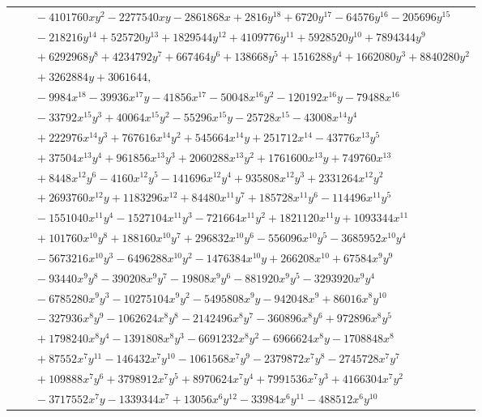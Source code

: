\documentclass[11pt]{article}
\begin{document}
\begin{longtable}{@{}ll@{}}
 & $\quad -4101760xy^{2}-2277540xy-2861868x+2816y^{18}+6720y^{17}-64576y^{16}-205696y^{15}$\\
 & $\quad -218216y^{14}+525720y^{13}+1829544y^{12}+4109776y^{11}+5928520y^{10}+7894344y^{9}$\\
 & $\quad +6292968y^{8}+4234792y^{7}+667464y^{6}+138668y^{5}+1516288y^{4}+1662080y^{3}+8840280y^{2}$\\
 & $\quad +3262884y+3061644,$\\
 & $\quad -9984x^{18}-39936x^{17}y-41856x^{17}-50048x^{16}y^{2}-120192x^{16}y-79488x^{16}$\\
 & $\quad -33792x^{15}y^{3}+40064x^{15}y^{2}-55296x^{15}y-25728x^{15}-43008x^{14}y^{4}$\\
 & $\quad +222976x^{14}y^{3}+767616x^{14}y^{2}+545664x^{14}y+251712x^{14}-43776x^{13}y^{5}$\\
 & $\quad +37504x^{13}y^{4}+961856x^{13}y^{3}+2060288x^{13}y^{2}+1761600x^{13}y+749760x^{13}$\\
 & $\quad +8448x^{12}y^{6}-4160x^{12}y^{5}-141696x^{12}y^{4}+935808x^{12}y^{3}+2331264x^{12}y^{2}$\\
 & $\quad +2693760x^{12}y+1183296x^{12}+84480x^{11}y^{7}+185728x^{11}y^{6}-114496x^{11}y^{5}$\\
 & $\quad -1551040x^{11}y^{4}-1527104x^{11}y^{3}-721664x^{11}y^{2}+1821120x^{11}y+1093344x^{11}$\\
 & $\quad +101760x^{10}y^{8}+188160x^{10}y^{7}+296832x^{10}y^{6}-556096x^{10}y^{5}-3685952x^{10}y^{4}$\\
 & $\quad -5673216x^{10}y^{3}-6496288x^{10}y^{2}-1476384x^{10}y+266208x^{10}+67584x^{9}y^{9}$\\
 & $\quad -93440x^{9}y^{8}-390208x^{9}y^{7}-19808x^{9}y^{6}-881920x^{9}y^{5}-3293920x^{9}y^{4}$\\
 & $\quad -6785280x^{9}y^{3}-10275104x^{9}y^{2}-5495808x^{9}y-942048x^{9}+86016x^{8}y^{10}$\\
 & $\quad -327936x^{8}y^{9}-1062624x^{8}y^{8}-2142496x^{8}y^{7}-360896x^{8}y^{6}+972896x^{8}y^{5}$\\
 & $\quad +1798240x^{8}y^{4}-1391808x^{8}y^{3}-6691232x^{8}y^{2}-6966624x^{8}y-1708848x^{8}$\\
 & $\quad +87552x^{7}y^{11}-146432x^{7}y^{10}-1061568x^{7}y^{9}-2379872x^{7}y^{8}-2745728x^{7}y^{7}$\\
 & $\quad +109888x^{7}y^{6}+3798912x^{7}y^{5}+8970624x^{7}y^{4}+7991536x^{7}y^{3}+4166304x^{7}y^{2}$\\
 & $\quad -3717552x^{7}y-1339344x^{7}+13056x^{6}y^{12}-33984x^{6}y^{11}-488512x^{6}y^{10}$\\

\end{longtable}
\end{document}
